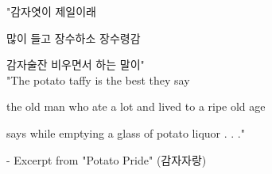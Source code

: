
\vspace*{\fill}
\begin{center}
"감자엿이 제일이래

많이 들고 장수하소 장수령감

감자술잔 비우면서 하는 말이"
\\[1in]
"The potato taffy is the best they say

  the old man who ate a lot and lived to a ripe old age

      says while emptying a glass of potato liquor . . ."
                                                                                         
                 - Excerpt from "Potato Pride" (감자자랑)
\end{center}
\vspace*{\fill}

